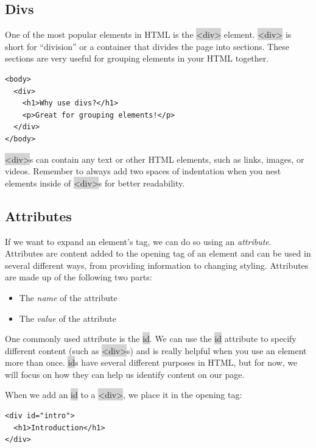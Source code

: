 \documentclass[11pt]{article}
\begin{document}
\subsection{Divs}
One of the most popular elements in HTML is the \colorbox{lightgray}{<div>} element. \colorbox{lightgray}{<div>} is short for “division” or a container that divides the page into sections. These sections are very useful for grouping elements in your HTML together.
\begin{lstlisting}
<body>
  <div>
    <h1>Why use divs?</h1>
    <p>Great for grouping elements!</p>
  </div>
</body>
\end{lstlisting}
\colorbox{lightgray}{<div>}s can contain any text or other HTML elements, such as links, images, or videos. Remember to always add two spaces of indentation when you nest elements inside of \colorbox{lightgray}{<div>}s for better readability.

\subsection{Attributes}
If we want to expand an element’s tag, we can do so using an \textit{attribute}. Attributes are content added to the opening tag of an element and can be used in several different ways, from providing information to changing styling. Attributes are made up of the following two parts:
\begin{itemize}[leftmargin = *]
\item The \textit{name} of the attribute
\item The \textit{value} of the attribute
\end{itemize}
One commonly used attribute is the \colorbox{lightgray}{id}. We can use the \colorbox{lightgray}{id} attribute to specify different content (such as \colorbox{lightgray}{<div>}s) and is really helpful when you use an element more than once. \colorbox{lightgray}{id}s have several different purposes in HTML, but for now, we will focus on how they can help us identify content on our page.

When we add an \colorbox{lightgray}{id} to a \colorbox{lightgray}{<div>}, we place it in the opening tag:
\begin{lstlisting}
<div id="intro">
  <h1>Introduction</h1>
</div>
\end{lstlisting}
\end{document}
